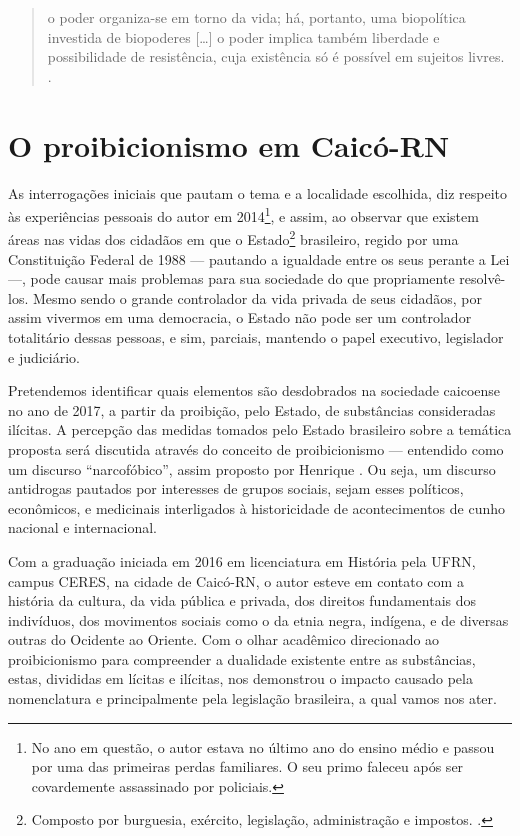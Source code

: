 \begin{refsection}
    \begin{quotation}
        o poder organiza-se em torno da vida; há, portanto, uma biopolítica investida de biopoderes [\dots] o poder implica também liberdade e possibilidade de resistência, cuja existência só é possível em sujeitos livres. \cite[p.~52]{Fernandes2012Discurso}.
    \end{quotation}

    \section{O proibicionismo em Caicó-RN}

    As interrogações iniciais que pautam o tema e a localidade escolhida, diz respeito às experiências pessoais do autor em 2014\footnote{No ano em questão, o autor estava no último ano do ensino médio e passou por uma das primeiras perdas familiares. O seu primo faleceu após ser covardemente assassinado por policiais.}, e assim, ao observar que existem áreas nas vidas dos cidadãos em que o Estado\footnote{Composto por burguesia, exército, legislação, administração e impostos. \cite{Koselleck2006Futuro}.} brasileiro, regido por uma Constituição Federal de 1988 --- pautando a igualdade entre os seus perante a Lei ---, pode causar mais problemas para sua sociedade do que propriamente resolvê-los. Mesmo sendo o grande controlador da vida privada de seus cidadãos, por assim vivermos em uma democracia, o Estado não pode ser um controlador totalitário dessas pessoas, e sim, parciais, mantendo o papel executivo, legislador e judiciário.

    Pretendemos identificar quais elementos são desdobrados na sociedade caicoense no ano de 2017, a partir da proibição, pelo Estado, de substâncias consideradas ilícitas. A percepção das medidas tomados pelo Estado brasileiro sobre a temática proposta será discutida através do conceito de proibicionismo --- entendido como um discurso ``narcofóbico'', assim proposto por Henrique \textcite{Carneiro2018Drogas}. Ou seja, um discurso antidrogas pautados por interesses de grupos sociais, sejam esses políticos, econômicos, e medicinais interligados à historicidade de acontecimentos de cunho nacional e internacional.

    Com a graduação iniciada em 2016 em licenciatura em História pela UFRN, campus CERES, na cidade de Caicó-RN, o autor esteve em contato com a história da cultura, da vida pública e privada, dos direitos fundamentais dos indivíduos, dos movimentos sociais como o da etnia negra, indígena, e de diversas outras do Ocidente ao Oriente. Com o olhar acadêmico direcionado ao proibicionismo para compreender a dualidade existente entre as substâncias, estas, divididas em lícitas e ilícitas, nos demonstrou o impacto causado pela nomenclatura e principalmente pela legislação brasileira, a qual vamos nos ater. 


\end{refsection}
